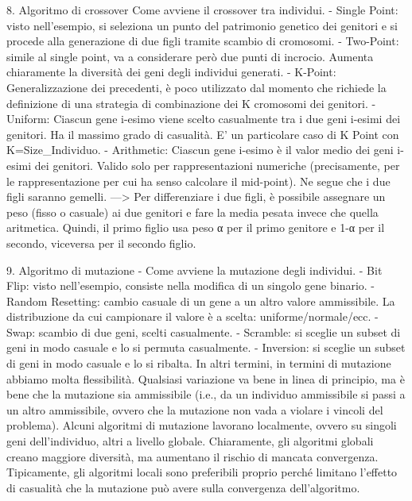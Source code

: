 \documentclass{article}
\begin{document}
    8. Algoritmo di crossover Come avviene il crossover tra individui.
    - Single Point: visto nell’esempio, si seleziona un punto del patrimonio genetico dei genitori e si procede alla generazione di due figli tramite scambio di
    cromosomi.
    - Two-Point: simile al single point, va a considerare però due punti di incrocio. Aumenta chiaramente la diversità dei geni degli individui generati.
    - K-Point: Generalizzazione dei precedenti, è poco utilizzato dal momento che richiede la definizione di una strategia di combinazione dei K cromosomi dei genitori.
    - Uniform: Ciascun gene i-esimo viene scelto casualmente tra i due geni i-esimi dei genitori.
    Ha il massimo grado di casualità. E’ un particolare caso di K Point con K=Size\_Individuo.
    - Arithmetic: Ciascun gene i-esimo è il valor medio dei geni i-esimi dei genitori. Valido solo per rappresentazioni numeriche (precisamente, per le rappresentazione
    per cui ha senso calcolare il mid-point). Ne segue che i due figli saranno gemelli. —> Per differenziare i due figli, è possibile assegnare un peso (fisso o casuale)
    ai due genitori e fare la media pesata invece che quella aritmetica. Quindi, il primo figlio usa peso α per il primo genitore e 1-α per il secondo, viceversa per il
    secondo figlio.

    9. Algoritmo di mutazione - Come avviene la mutazione degli individui.
    - Bit Flip: visto nell’esempio, consiste nella modifica di un singolo gene binario.
    - Random Resetting: cambio casuale di un gene a un altro valore ammissibile. La distribuzione da cui campionare il valore è a scelta: uniforme/normale/ecc.
    - Swap: scambio di due geni, scelti casualmente.
    - Scramble: si sceglie un subset di geni in modo casuale e lo si permuta casualmente.
    - Inversion: si sceglie un subset di geni in modo casuale e lo si ribalta.
    In altri termini, in termini di mutazione abbiamo molta flessibilità. Qualsiasi variazione va bene in linea di principio, ma è bene che la mutazione sia ammissibile
    (i.e., da un individuo ammissibile si passi a un altro ammissibile, ovvero che la mutazione non vada a violare i vincoli del problema).
    Alcuni algoritmi di mutazione lavorano localmente, ovvero su singoli geni dell’individuo, altri a livello globale. Chiaramente, gli algoritmi globali creano
    maggiore diversità, ma aumentano il rischio di mancata convergenza.
    Tipicamente, gli algoritmi locali sono preferibili proprio perché limitano l’effetto di casualità che la mutazione può avere sulla convergenza dell’algoritmo.
\end{document}
